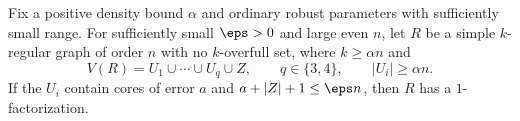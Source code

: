 \begin{theorem}\label{three:thm:regular-four}
Fix a positive density bound $\alpha$ and ordinary robust parameters
with sufficiently small range. For sufficiently small $\eps>0$
and large even $n$, let $R$ be a simple $k$-regular graph of order
$n$ with no $k$-overfull set, where $k\ge\alpha n$ and
\[
 V(R)=U_1\cup\cdots\cup U_q\cup Z,\qquad q\in\{3,4\},
 \qquad |U_i|\ge\alpha n.
\]
If the $U_i$ contain cores of error $a$ and
$a+|Z|+1\le\eps n$, then $R$ has a $1$-factorization.
\end{theorem}